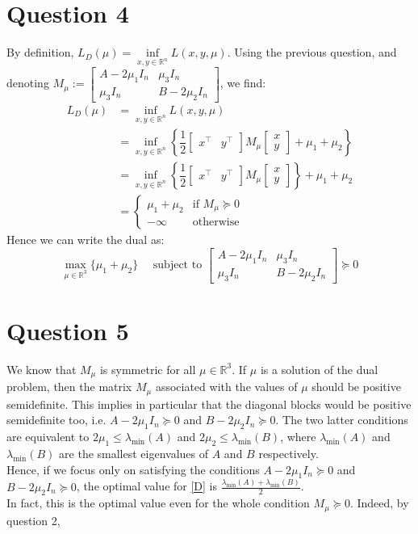 \documentclass{article}
\newcommand{\R}{\mathbb{R}}
\newcommand{\tp}{^\top}
\begin{document}
\section*{Question 4}
By definition, $L_D(\mu)=\inf\limits_{x,y\in\R^n} L(x,y,\mu)$. Using the previous question, and denoting $M_\mu:=\begin{bmatrix} A-2\mu_1 I_n & \mu_3 I_n \\
\mu_3 I_n & B-2\mu_2 I_n \end{bmatrix}$, we find:
\begin{align*}
L_D(\mu)&=\inf\limits_{x,y\in\R^n} L(x,y,\mu) \\
&=\inf\limits_{x,y\in\R^n} \left\lbrace \dfrac{1}{2} \begin{bmatrix} x\tp & y\tp\end{bmatrix}M_\mu\begin{bmatrix} x \\ y \end{bmatrix} +\mu_1+\mu_2 \right\rbrace \\
&=\inf\limits_{x,y\in\R^n} \left\lbrace \dfrac{1}{2} \begin{bmatrix} x\tp & y\tp\end{bmatrix}M_\mu\begin{bmatrix} x \\ y \end{bmatrix} \right\rbrace+\mu_1+\mu_2   \\
&=\begin{cases} \mu_1+\mu_2 &\text{if }M_\mu\succeq 0 \\ -\infty &\text{otherwise} \end{cases}
\end{align*}
Hence we can write the dual as:
\begin{equation*}\tag{D} \label{D}
\max_{\mu\in\R^3} \{\mu_1+\mu_2\} \quad \text{ subject to } \begin{bmatrix} A-2\mu_1 I_n & \mu_3 I_n \\
\mu_3 I_n & B-2\mu_2 I_n \end{bmatrix} \succeq 0
\end{equation*}

\section*{Question 5}
We know that $M_\mu$ is symmetric for all $\mu\in\R^3$. If $\mu$ is a solution of the dual problem, then the matrix $M_\mu$ associated with the values of $\mu$ should be positive semidefinite. This implies in particular that the diagonal blocks would be positive semidefinite too, i.e. $A-2\mu_1 I_n\succeq 0$ and $B-2\mu_2 I_n \succeq 0$. The two latter conditions are equivalent to $2\mu_1\leq \lambda_{\min} (A)$ and $2\mu_2\leq \lambda_{\min}(B)$, where  $\lambda_{\min} (A)$ and $\lambda_{\min} (B)$ are the smallest eigenvalues of $A$ and $B$ respectively.\\
Hence, if we focus only on satisfying the conditions  $A-2\mu_1 I_n\succeq 0$ and $B-2\mu_2 I_n \succeq 0$, the optimal value for \eqref{D} is $\frac{\lambda_{\min} (A)+\lambda_{\min} (B)}{2}$. \\
In fact, this is the optimal value even for the whole condition $M_\mu\succeq 0$. Indeed, by question 2, %
\end{document}
